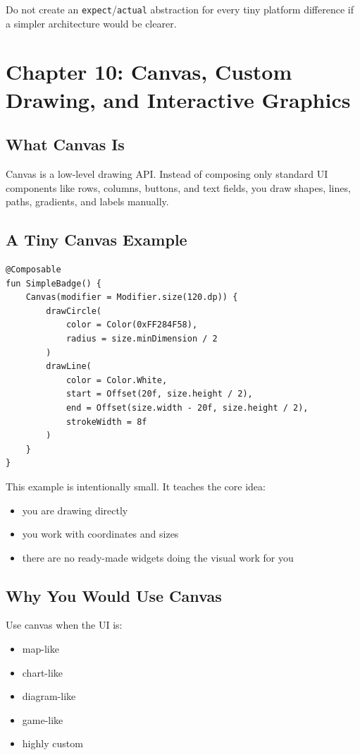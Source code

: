 \documentclass[11pt,a4paper]{article}
\begin{document}
Do not create an \texttt{expect}/\texttt{actual} abstraction for every tiny platform difference if a simpler architecture would be clearer.

\section{Chapter 10: Canvas, Custom Drawing, and Interactive Graphics}

\subsection{What Canvas Is}

Canvas is a low-level drawing API. Instead of composing only standard UI components like rows, columns, buttons, and text fields, you draw shapes, lines, paths, gradients, and labels manually.

\subsection{A Tiny Canvas Example}

\begin{lstlisting}[style=kazekotlin]
@Composable
fun SimpleBadge() {
    Canvas(modifier = Modifier.size(120.dp)) {
        drawCircle(
            color = Color(0xFF284F58),
            radius = size.minDimension / 2
        )
        drawLine(
            color = Color.White,
            start = Offset(20f, size.height / 2),
            end = Offset(size.width - 20f, size.height / 2),
            strokeWidth = 8f
        )
    }
}
\end{lstlisting}

This example is intentionally small. It teaches the core idea:
\begin{itemize}
    \item you are drawing directly
    \item you work with coordinates and sizes
    \item there are no ready-made widgets doing the visual work for you
\end{itemize}

\subsection{Why You Would Use Canvas}

Use canvas when the UI is:
\begin{itemize}
    \item map-like
    \item chart-like
    \item diagram-like
    \item game-like
    \item highly custom
\end{itemize}
\end{document}
